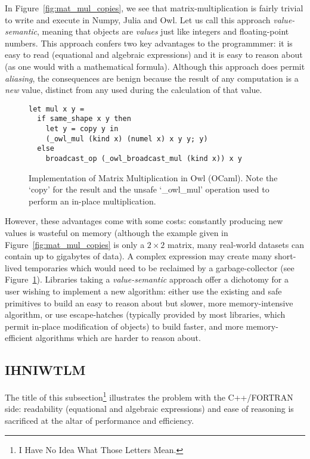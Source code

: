 In Figure~\ref{fig:mat_mul_copies}, we see that matrix-multiplication is fairly
trivial to write and execute in Numpy, Julia and Owl. Let us call this approach
\emph{value-semantic}, meaning that objects are \emph{values} just like
integers and floating-point numbers. This approach confers two key advantages to the
programmmer: it is easy to read (equational and algebraic expressions) and it
is easy to reason about (as one would with a mathematical formula). Although this
approach does permit \emph{aliasing}, the consequences are benign because the
result of any computation is a \emph{new} value, distinct from any used during
the calculation of that value.

\begin{figure}[tbp]
    \centering
    \begin{verbatim}
let mul x y =
  if same_shape x y then
    let y = copy y in
    (_owl_mul (kind x) (numel x) x y y; y)
  else
    broadcast_op (_owl_broadcast_mul (kind x)) x y
    \end{verbatim}
    \caption{Implementation of Matrix Multiplication in Owl (OCaml).
        Note the `copy' for the result and the unsafe `\_owl\_mul' operation
    used to perform an in-place multiplication.}\label{fig:mat_mul_owl}
\end{figure}

However, these advantages come with some costs: constantly producing new values
is wasteful on memory (although the example given in
Figure~\ref{fig:mat_mul_copies} is only a $2 \times 2$ matrix, many real-world
datasets can contain up to gigabytes of data). A complex expression may create
many short-lived temporaries which would need to be reclaimed by a
garbage-collector (see Figure~\ref{fig:mat_mul_owl}). Libraries taking a
\emph{value-semantic} approach offer a dichotomy for a user wishing to
implement a new algorithm: either use the existing and safe primitives to build
an easy to reason about but slower, more memory-intensive algorithm, or use
escape-hatches (typically provided by most libraries, which permit in-place
modification of objects) to build faster, and more memory-efficient algorithms
which are harder to reason about.

\subsection{IHNIWTLM}
The title of this subsection\footnote{I Have No Idea What Those Letters Mean.}
illustrates the problem with the C++/FORTRAN side: readability (equational
and algebraic expressions) and ease of reasoning is sacrificed at
the altar of performance and efficiency.

